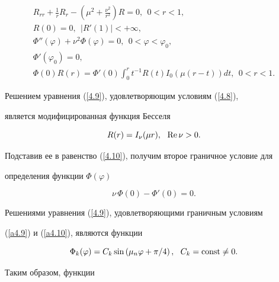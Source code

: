 \begin{gather}


R_{rr}+\frac1r R_r-\left(\mu^2+


\frac{\nu^2}{r^2}\right)R=0,\ \ 0<r<1,\label{4.7} \\


%


R(0)=0,\ \ | R'(1)| <+\infty,\label{4.8} \\


%


\Phi''(\varphi)+\nu^2\Phi(\varphi)=0,\ \ 0<\varphi<\varphi_0,\label{4.9}\\


%


\Phi'(\varphi_0)=0,\label{a4.9} \\


%


\Phi(0)R(r)=\Phi'(0)\int_0^r t^{-1}R(t)I_0(\mu(r-t))dt,\ \


0<r<1.\label{4.10}


\end{gather}


Решением уравнения (\ref{4.9}), удовлетворяющим условиям (\ref{4.8}), 


является модифицированная функция Бесселя


$$


R(r)=I_\nu(\mu r),\ \ \re\nu>0.


$$


Подставив ее в равенство (\ref{4.10}), получим второе граничное условие для


определения функции $\Phi(\varphi)$


\begin{equation}


\nu\,\Phi(0)-\Phi'(0)=0.\label{a4.10}


\end{equation}


Решениями уравнения (\ref{4.9}), удовлетворяющими граничным условиям


(\ref{a4.9}) и (\ref{a4.10}), являются функции


$$


\Phi_k(\varphi)=C_k\sin\left(\mu_n\varphi+\pi/4\right),\ \


C_k=\const\ne0.


$$





Таким образом, функции


$$


